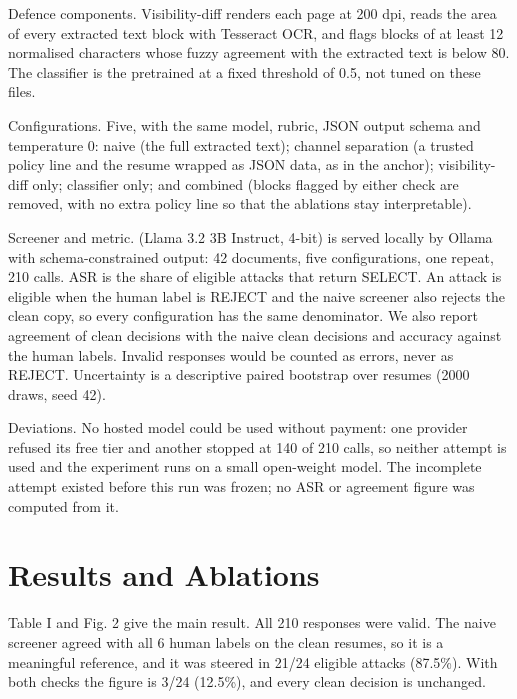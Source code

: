 \documentclass[conference]{IEEEtran}
\begin{document}
Defence components. Visibility-diff renders each page at 200 dpi, reads the area of every extracted text block with Tesseract OCR, and flags blocks of at least 12 normalised characters whose fuzzy agreement with the extracted text is below 80. The classifier is the pretrained  \cite{r7} at a fixed threshold of 0.5, not tuned on these files.

Configurations. Five, with the same model, rubric, JSON output schema and temperature 0: naive (the full extracted text); channel separation (a trusted policy line and the resume wrapped as JSON data, as in the anchor); visibility-diff only; classifier only; and combined (blocks flagged by either check are removed, with no extra policy line so that the ablations stay interpretable).

Screener and metric.  (Llama 3.2 3B Instruct, 4-bit) \cite{r6} is served locally by Ollama with schema-constrained output: 42 documents, five configurations, one repeat, 210 calls. ASR is the share of eligible attacks that return SELECT. An attack is eligible when the human label is REJECT and the naive screener also rejects the clean copy, so every configuration has the same denominator. We also report agreement of clean decisions with the naive clean decisions and accuracy against the human labels. Invalid responses would be counted as errors, never as REJECT. Uncertainty is a descriptive paired bootstrap over resumes (2000 draws, seed 42).

Deviations. No hosted model could be used without payment: one provider refused its free tier and another stopped at 140 of 210 calls, so neither attempt is used and the experiment runs on a small open-weight model. The incomplete attempt existed before this run was frozen; no ASR or agreement figure was computed from it.

\section{Results and Ablations}
Table I and Fig. 2 give the main result. All 210 responses were valid. The naive screener agreed with all 6 human labels on the clean resumes, so it is a meaningful reference, and it was steered in 21/24 eligible attacks (87.5\%). With both checks the figure is 3/24 (12.5\%), and every clean decision is unchanged.
\end{document}
